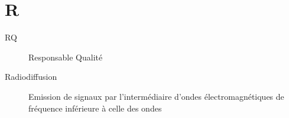 \section{R}

\begin{description}

\item[RQ] Responsable Qualité

\item[Radiodiffusion] Emission de signaux par l'intermédiaire d'ondes électromagnétiques de fréquence inférieure à celle des ondes 

\end{description}

